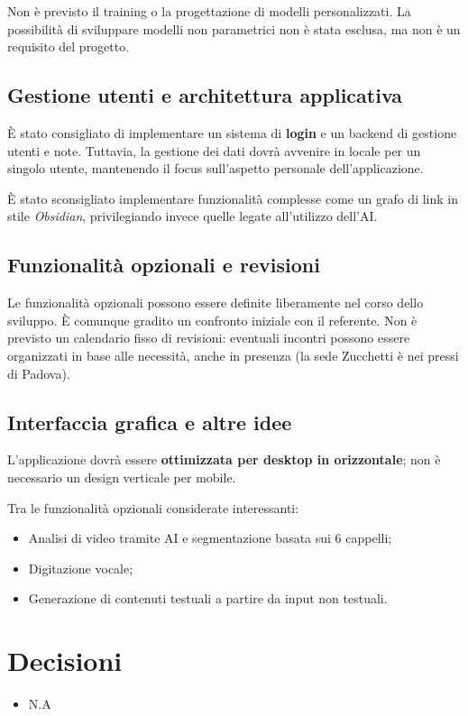 \documentclass[a4paper,12pt]{article}
\begin{document}
Non è previsto il training o la progettazione di modelli personalizzati. La possibilità di sviluppare modelli non parametrici non è stata esclusa, ma non è un requisito del progetto.

\subsection{Gestione utenti e architettura applicativa}
È stato consigliato di implementare un sistema di \textbf{login} e un backend di gestione utenti e note. Tuttavia, la gestione dei dati dovrà avvenire in locale per un singolo utente, mantenendo il focus sull’aspetto personale dell’applicazione.  

È stato sconsigliato implementare funzionalità complesse come un grafo di link in stile \textit{Obsidian}, privilegiando invece quelle legate all’utilizzo dell’AI.

\subsection{Funzionalità opzionali e revisioni}
Le funzionalità opzionali possono essere definite liberamente nel corso dello sviluppo. È comunque gradito un confronto iniziale con il referente.  
Non è previsto un calendario fisso di revisioni: eventuali incontri possono essere organizzati in base alle necessità, anche in presenza (la sede Zucchetti è nei pressi di Padova).

\subsection{Interfaccia grafica e altre idee}
L’applicazione dovrà essere \textbf{ottimizzata per desktop in orizzontale}; non è necessario un design verticale per mobile.  

Tra le funzionalità opzionali considerate interessanti:
\begin{itemize}
    \item Analisi di video tramite AI e segmentazione basata sui 6 cappelli;
    \item Digitazione vocale;
    \item Generazione di contenuti testuali a partire da input non testuali.
\end{itemize}

\section{Decisioni}
\begin{itemize}
    \item N.A
\end{itemize}
\end{document}
